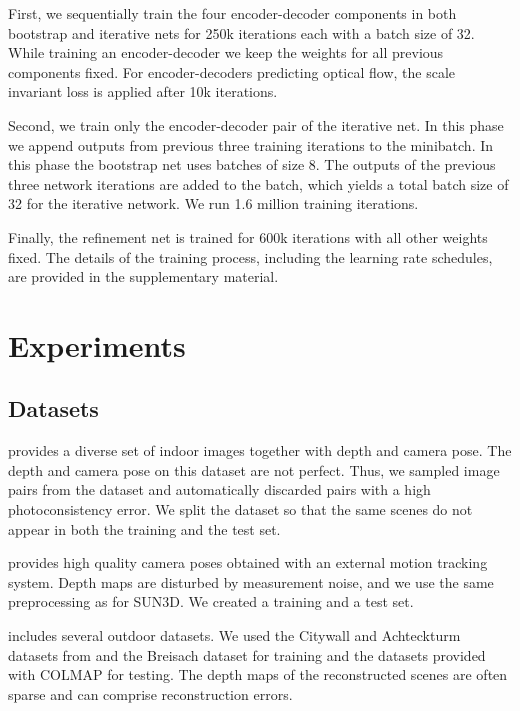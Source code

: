 \documentclass[10pt,twocolumn,letterpaper]{article}
\begin{document}
First, we sequentially train the four encoder-decoder components in both bootstrap and iterative nets for 250k iterations each with a batch size of 32.
While training an encoder-decoder we keep the weights for all previous components fixed.
For encoder-decoders predicting optical flow, the scale invariant loss is applied after 10k iterations.


Second, we train only the encoder-decoder pair of the iterative net.
In this phase we append outputs from previous three training iterations to the minibatch.
In this phase the bootstrap net uses batches of size 8. 
The outputs of the previous three network iterations are added to the batch, which yields a total batch size of 32 for the iterative network. 
We run 1.6 million training iterations.

Finally, the refinement net is trained for 600k iterations with all other weights fixed. 
The details of the training process, including the learning rate schedules, are provided in the supplementary material.

\section{Experiments}


\subsection{Datasets}

 \cite{xiao_sun3d_2013} provides a diverse set of indoor images together with depth and camera pose.
The depth and camera pose on this dataset are not perfect.
Thus, we sampled image pairs from the dataset and automatically discarded pairs with a high photoconsistency error. We split the dataset so that the same scenes do not appear in both the training and the test set.

 \cite{sturm12iros} provides high quality camera poses obtained with an external motion tracking system.
Depth maps are disturbed by measurement noise, and we use the same preprocessing as for SUN3D. We created a training and a test set. 

 includes several outdoor datasets. We used the Citywall and Achteckturm datasets from \cite{fuhrmann2014mve} and the Breisach dataset \cite{UB15} for training and the datasets provided with COLMAP \cite{schoenberger2016sfm,schoenberger2016mvs} for testing. The depth maps of the reconstructed scenes are often sparse and can comprise reconstruction errors.
\end{document}
